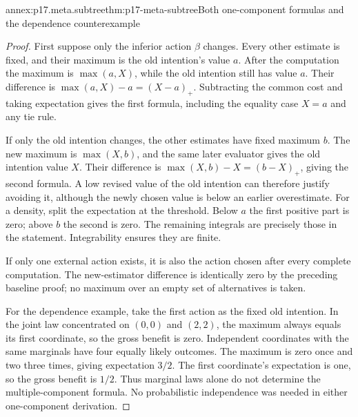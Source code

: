 \begin{annexitem}{annex:p17.meta.subtree}{thm:p17-meta-subtree}{Both one-component formulas and the dependence counterexample}
\begin{proof}
First suppose only the inferior action \(\beta\) changes.
Every other estimate is fixed, and their maximum is the old
intention's value \(a\). After the computation the maximum is
\(\max(a,X)\), while the old intention still has value \(a\).
Their difference is \(\max(a,X)-a=(X-a)_+\).
Subtracting the common cost and taking expectation gives the
first formula, including the equality case \(X=a\) and any
tie rule.

If only the old intention changes, the other estimates have fixed
maximum \(b\). The new maximum is \(\max(X,b)\), and the
same later evaluator gives the old intention value \(X\).
Their difference is \(\max(X,b)-X=(b-X)_+\), giving the
second formula. A low revised value of the old intention can
therefore justify avoiding it, although the newly chosen value
is below an earlier overestimate. For a density, split the
expectation at the threshold. Below \(a\) the first positive
part is zero; above \(b\) the second is zero. The remaining
integrals are precisely those in the statement. Integrability
ensures they are finite.

If only one external action exists, it is also the action chosen
after every complete computation. The new-estimator difference
is identically zero by the preceding baseline proof; no maximum
over an empty set of alternatives is taken.

For the dependence example, take the first action as the fixed
old intention. In the joint law concentrated on \((0,0)\) and
\((2,2)\), the maximum always equals its first coordinate,
so the gross benefit is zero. Independent coordinates with the
same marginals have four equally likely outcomes. The maximum
is zero once and two three times, giving expectation \(3/2\).
The first coordinate's expectation is one, so the gross benefit
is \(1/2\). Thus marginal laws alone do not determine the
multiple-component formula. No probabilistic independence was
needed in either one-component derivation.
\end{proof}
\end{annexitem}


